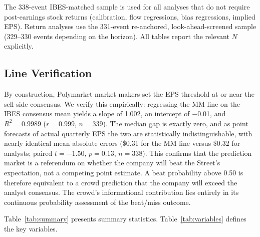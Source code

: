 \documentclass[11pt]{article}
\begin{document}
The 338-event IBES-matched sample is used for all analyses that do not require post-earnings stock returns (calibration, flow regressions, bias regressions, implied EPS). Return analyses use the 331-event re-anchored, look-ahead-screened sample (329--330 events depending on the horizon). All tables report the relevant $N$ explicitly.

\subsection{Line Verification}

By construction, Polymarket market makers set the EPS threshold at or near the sell-side consensus. We verify this empirically: regressing the MM line on the IBES consensus mean yields a slope of 1.002, an intercept of $-$0.01, and $R^2 = 0.9989$ ($r = 0.999$, $n = 339$). The median gap is exactly zero, and as point forecasts of actual quarterly EPS the two are statistically indistinguishable, with nearly identical mean absolute errors (\$0.31 for the MM line versus \$0.32 for analysts; paired $t = -1.50$, $p = 0.13$, $n = 338$). This confirms that the prediction market is a referendum on whether the company will beat the Street's expectation, not a competing point estimate. A beat probability above 0.50 is therefore equivalent to a crowd prediction that the company will exceed the analyst consensus. The crowd's informational contribution lies entirely in its continuous probability assessment of the beat/miss outcome.

Table~\ref{tab:summary} presents summary statistics. Table~\ref{tab:variables} defines the key variables.
\end{document}
